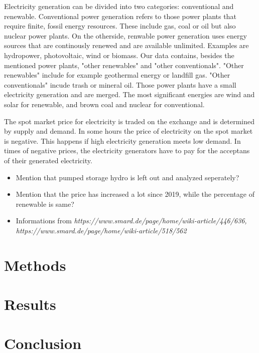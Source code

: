 \documentclass{article}
\begin{document}
Electricity generation can be divided into two categories: conventional and renewable. Conventional power generation refers to those power plants that require finite, fossil energy resources. These include gas, coal or oil but also nuclear power plants. On the otherside, renwable power generation uses energy sources that are continously renewed and are available unlimited. Examples are hydropower, photovoltaic, wind or biomass. Our data contains, besides the mentioned power plants, "other renewables" and "other conventionals". "Other renewables" include for example geothermal energy or landfill gas. "Other conventionals" incude trash or mineral oil. Those power plants have a small electricity generation and are merged. The most significant energies are wind and solar for renewable, and brown coal and nuclear for conventional. 

The spot market price for electricity is traded on the exchange and is determined by supply and demand. In some hours the price of electricity on the spot market is negative. This happens if high electricity generation meets low demand. In times of negative prices, the electricity generators have to pay for the acceptans of their generated electricity. 

\begin{itemize}
    \item Mention that pumped storage hydro is left out and analyzed seperately?
    \item Mention that the price has increased a lot since 2019, while the percentage of renewable is same?
    \\
    \item Informations from \textit{https://www.smard.de/page/home/wiki-article/446/636, https://www.smard.de/page/home/wiki-article/518/562}
\end{itemize}

\section{Methods}

\section{Results}

\section{Conclusion}
\end{document}
